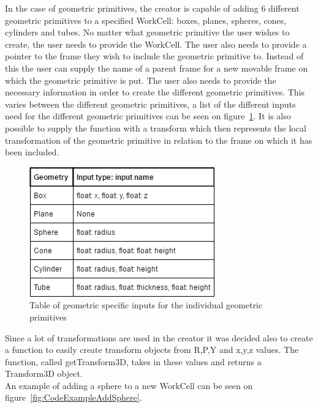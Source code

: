 In the case of geometric primitives, the creator is capable of adding 6 different geometric primitives to a specified WorkCell: boxes, planes, spheres, cones, cylinders and tubes. No matter what geometric primitive the user wishes to create, the user needs to provide the WorkCell. The user also needs to provide a pointer to the frame they wish to include the geometric primitive to. Instead of this the user can supply the name of a parent frame for a new movable frame on which the geometric primitive is put. The user also needs to provide the necessary information in order to create the different geometric primitives. This varies between the different geometric primitives, a list of the different inputs need for the different geometric primitives can be seen on figure~\ref{fig:InputsForGeoms}. It is also possible to supply the function with a transform which then represents the local transformation of the geometric primitive in relation to the frame on which it has been included.\\

\begin{figure}[h]
	\centering
	\includegraphics[scale=0.55]{Figures/InputsForGeoms.png}
	\caption{Table of geometric specific inputs for the individual geometric primitives}
	\label{fig:InputsForGeoms}
\end{figure}

Since a lot of transformations are used in the creator it was decided also to create a function to easily create transform objects from R,P,Y and x,y,z values. The function, called getTransform3D, takes in these values and returns a Transform3D object.\\

An example of adding a sphere to a new WorkCell can be seen on figure~\ref{fig:CodeExampleAddSphere}.


